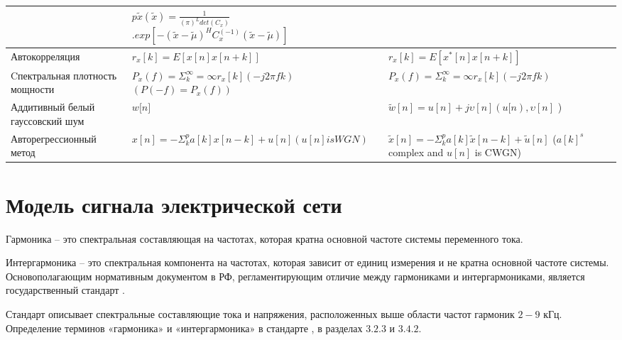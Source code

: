 \begin{table} [htbp]
\begin{tabular}{| p{4cm} || p{6cm} | p{6cm} |}
		&$p\widetilde{x}(\widetilde{x})=\frac{1}{(\pi)^L det(C_x)}$ 
		\linebreak
		$.exp[-(\widetilde{x}-\widetilde{\mu})^H C_x^(-1)(\widetilde{x}-\widetilde{\mu})]$ \\
		\hline
		Автокорреляция &$r_x[k]=E[x[n]x[n+k]]$        
		&  $r_x[k]=E[x^*[n]x[n+k]]$ \\
		\hline
		Cпектральная плотность мощности & $P_x(f)=\Sigma_k^\infty=\infty r_x[k](-j2\pi fk)$  
		$(P(-f)=P_x(f))$               
		& $P_x(f)=\Sigma_k^\infty=\infty r_x[k](-j2\pi fk)$ \\
		\hline
		Аддитивный белый гауссовский шум & $w{[}n{]}$                       
		&$\widetilde{w}[n]=u[n]+j\upsilon[n]  
		(u[n),\upsilon[n]$ \linebreak) \\
		\hline
		Авторегрессионный метод &
		$x[n]=-\Sigma_k^p a[k]x[n-k]+u[n] (u[n] is WGN)$
		& $\widetilde{x}[n]=-\Sigma_k^p a[k]\widetilde{x}[n-k]+\widetilde{u}[n]$  \linebreak  
		($a[k]^s$ complex and $u[n]$ is CWGN) \\
		\hline
		\hline
	\end{tabular}
\end{table}



\section{Модель сигнала электрической сети} \label{sec:ch1/sec5}

Гармоника -- это спектральная составляющая на частотах, которая кратна основной частоте системы переменного тока. 

Интергармоника -- это спектральная компонента на частотах, которая зависит от единиц измерения и не кратна основной частоте системы.
Основополагающим нормативным документом в РФ, регламентирующим отличие между гармониками и интергармониками, является государственный стандарт \cite{GOST30804.4.7-2013}. 

Стандарт  описывает спектральные составляющие тока и напряжения, расположенных выше области частот гармоник $2-9$ кГц. Определение терминов «гармоника» и «интергармоника» в стандарте \cite{GOST30804.4.7-2013}, в разделах $3.2.3$ и $3.4.2$.


